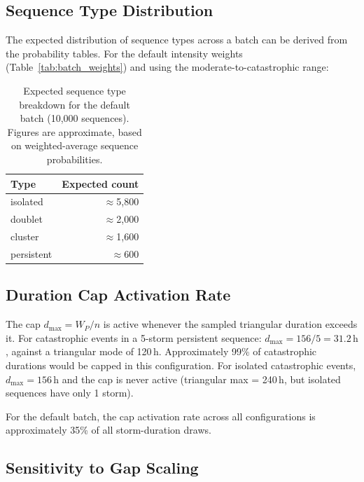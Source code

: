 \documentclass[11pt,a4paper]{article}
\begin{document}
\mkmsensitivity

\subsection{Sequence Type Distribution}

The expected distribution of sequence types across a batch can be derived from the
probability tables. For the default intensity weights (Table~\ref{tab:batch_weights})
and using the moderate-to-catastrophic range:

\begin{table}[H]
  \centering
  \caption{Expected sequence type breakdown for the default batch (10{,}000 sequences).
           Figures are approximate, based on weighted-average sequence probabilities.}
  \label{tab:expected_types}
  \begin{tabular}{lr}
    \toprule
    \textbf{Type} & \textbf{Expected count} \\
    \midrule
    isolated   & $\approx$5{,}800 \\
    doublet    & $\approx$2{,}000 \\
    cluster    & $\approx$1{,}600 \\
    persistent & $\approx$600 \\
    \bottomrule
  \end{tabular}
\end{table}

\subsection{Duration Cap Activation Rate}

The cap $d_{\max} = W_P / n$ is active whenever the sampled triangular duration
exceeds it. For catastrophic events in a 5-storm persistent sequence:
$d_{\max} = 156/5 = 31.2\,\text{h}$, against a triangular mode of 120\,h.
Approximately 99\% of catastrophic durations would be capped in this configuration.
For isolated catastrophic events, $d_{\max} = 156\,\text{h}$ and the cap is never
active (triangular max = 240\,h, but isolated sequences have only 1 storm).

For the default batch, the cap activation rate across all configurations is
approximately 35\% of all storm-duration draws.

\subsection{Sensitivity to Gap Scaling}
\end{document}
